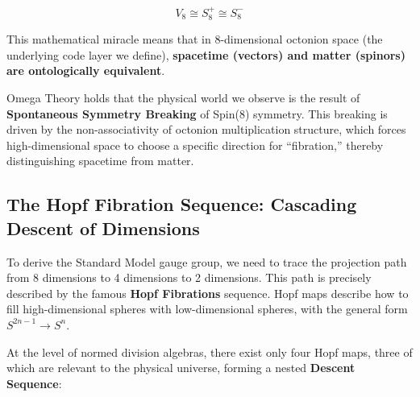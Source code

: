 \[V_8 \cong S_8^+ \cong S_8^-\]

This mathematical miracle means that in 8-dimensional octonion space (the underlying code layer we define), \textbf{spacetime (vectors) and matter (spinors) are ontologically equivalent}.

Omega Theory holds that the physical world we observe is the result of \textbf{Spontaneous Symmetry Breaking} of Spin(8) symmetry. This breaking is driven by the non-associativity of octonion multiplication structure, which forces high-dimensional space to choose a specific direction for ``fibration,'' thereby distinguishing spacetime from matter.

\subsection{The Hopf Fibration Sequence: Cascading Descent of Dimensions}

To derive the Standard Model gauge group, we need to trace the projection path from 8 dimensions to 4 dimensions to 2 dimensions. This path is precisely described by the famous \textbf{Hopf Fibrations} sequence. Hopf maps describe how to fill high-dimensional spheres with low-dimensional spheres, with the general form $S^{2n-1} \to S^n$.

At the level of normed division algebras, there exist only four Hopf maps, three of which are relevant to the physical universe, forming a nested \textbf{Descent Sequence}:

